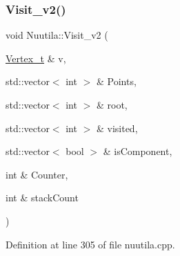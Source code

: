 \mbox{\label{class_nuutila_afc7a8c27d8de17ac2679f839ff8c2749}} 
\subsubsection{\texorpdfstring{Visit\+\_\+v2()}{Visit\_v2()}}
{\footnotesize\ttfamily void Nuutila\+::\+Visit\+\_\+v2 (\begin{DoxyParamCaption}\item[{\hyperlink{class_graph_component_ae67114a6ce5a001dc35e1996e1b45aa0}{Vertex\+\_\+t} \&}]{v,  }\item[{std\+::vector$<$ int $>$ \&}]{Points,  }\item[{std\+::vector$<$ int $>$ \&}]{root,  }\item[{std\+::vector$<$ int $>$ \&}]{visited,  }\item[{std\+::vector$<$ bool $>$ \&}]{is\+Component,  }\item[{int \&}]{Counter,  }\item[{int \&}]{stack\+Count }\end{DoxyParamCaption})}



Definition at line 305 of file nuutila.\+cpp.


